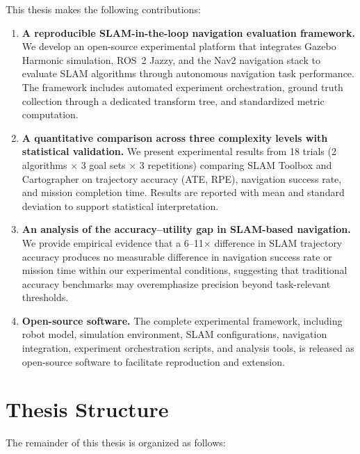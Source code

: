 This thesis makes the following contributions:

\begin{enumerate}
\item \textbf{A reproducible SLAM-in-the-loop navigation evaluation framework.} We develop an open-source experimental platform that integrates Gazebo Harmonic simulation, ROS~2 Jazzy, and the Nav2 navigation stack to evaluate SLAM algorithms through autonomous navigation task performance. The framework includes automated experiment orchestration, ground truth collection through a dedicated transform tree, and standardized metric computation.

\item \textbf{A quantitative comparison across three complexity levels with statistical validation.} We present experimental results from 18 trials (2 algorithms $\times$ 3 goal sets $\times$ 3 repetitions) comparing SLAM Toolbox and Cartographer on trajectory accuracy (ATE, RPE), navigation success rate, and mission completion time. Results are reported with mean and standard deviation to support statistical interpretation.

\item \textbf{An analysis of the accuracy--utility gap in SLAM-based navigation.} We provide empirical evidence that a 6--11$\times$ difference in SLAM trajectory accuracy produces no measurable difference in navigation success rate or mission time within our experimental conditions, suggesting that traditional accuracy benchmarks may overemphasize precision beyond task-relevant thresholds.

\item \textbf{Open-source software.} The complete experimental framework, including robot model, simulation environment, SLAM configurations, navigation integration, experiment orchestration scripts, and analysis tools, is released as open-source software to facilitate reproduction and extension.
\end{enumerate}

\section{Thesis Structure}

The remainder of this thesis is organized as follows:

